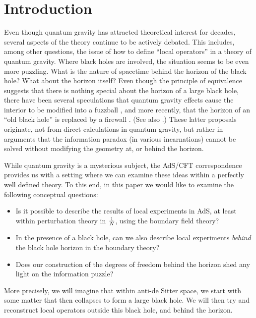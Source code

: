 
\section{Introduction}
Even though quantum gravity has attracted theoretical interest for decades, several aspects of the theory continue to be actively debated. This includes, among other questions, the issue of how to define ``local operators'' in a theory of quantum gravity. Where black holes are involved, the situation seems to be even more puzzling. What is the nature of spacetime behind the horizon of the black hole? What about the horizon itself? Even though the principle of equivalence suggests that there is nothing special about the horizon of a large black hole, there have been several speculations that quantum gravity effects cause the interior to be modified into a fuzzball \cite{Mathur:2012np,Mathur:2009hf,Mathur:2008nj,Lunin:2002bj,Lunin:2001fv}, and more recently, that the horizon of an ``old black hole'' 
is replaced by a firewall \cite{Almheiri:2012rt}. (See also \cite{Bousso:2012as, Nomura:2012sw, Mathur:2012jk, Susskind:2012rm, Bena:2012zi, Giveon:2012kp, Banks:2012nn, Ori:2012jx, Brustein:2012jn, Susskind:2012uw, Marolf:2012xe,  Hossenfelder:2012mr, Nomura:2012cx, Hwang:2012nn, Larjo:2012jt,braunstein2009v1, Avery:2012tf, Chowdhury:2012vd}.)  These latter proposals originate, not from direct calculations in quantum gravity, but rather in arguments that the information 
paradox (in various incarnations) cannot be solved without modifying the geometry at, or behind the horizon.

While quantum gravity is a mysterious subject, the AdS/CFT correspondence \cite{Maldacena:1997re} provides us with a setting where we can examine these ideas within a perfectly well defined theory. To this end, in this paper we would like to examine the following conceptual questions:
\begin{itemize}
\item
Is it possible to describe the results of local experiments in AdS, at least within perturbation theory in ${1 \over N}$, using the boundary field theory?
\item
In the presence of a black hole, can we also describe local experiments {\em behind} the black hole horizon in the boundary theory?
\item
Does our construction of the degrees of freedom behind the horizon shed any light on the information puzzle?
\end{itemize}
More precisely, we will imagine that within anti-de Sitter space, we start with some matter that then collapses to form a large black hole. We will then try and reconstruct local operators outside this black hole, and behind the horizon. 

